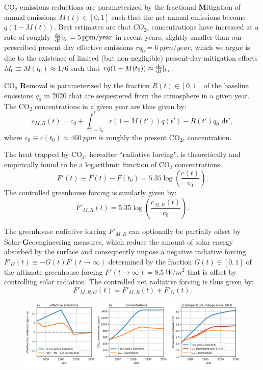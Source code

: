 \documentclass{article}
\begin{document}
CO$_{2}$ emissions reductions are parameterized by the fractional \textbf{M}itigation of annual emissions $M(t) \in [0,1]$ such that the net annual emissions become $q(1-M(t))$. Best estimates are that $CO_{2e}$ concentrations have increased at a rate of roughly $\dv{c}{t}|_{t_{0}} = \SI{5}{ppm/year}$ in recent years, slightly smaller than our prescribed present day effective emissions $rq_{0}= \SI{6}{ppm/year}$, which we argue is due to the existence of limited (but non-negligible) present-day mitigation efforts $M_{0} \equiv M(t_{0}) \approx 1/6$ such that $rq(1-M(t_{0})) \approx \dv{c}{t}|_{t_{0}}$.

CO$_{2}$ \textbf{R}emoval is parameterized by the fraction $R(t) \in [0,1]$ of the baseline emissions $q_{0}$ in 2020 that are sequestered from the atmosphere in a given year. The CO$_{2}$ concentrations in a given year are thus given by:
\begin{equation}
    c_{M, R}(t) = c_{0} + \int_{t'=t_{0}}^{t} r(1-M(t'))q(t') - R(t')q_{0} \text{ d}t'\label{eq-CO2-conc},
\end{equation}
where $c_{0} \equiv c(t_{0}) \approx \SI{460}{ppm}$ is roughly the present CO$_{2e}$ concentration.

The heat trapped by CO$_{2}$, hereafter ``radiative forcing", is theoretically and empirically found to be a logarithmic function of CO$_{2}$ concentrations
\begin{equation}
    F'(t) \equiv F(t) - F(t_{0}) = 5.35 \log(\frac{c(t)}{c_{0}}).
\end{equation}
The controlled greenhouse forcing is similarly given by:
\begin{equation}
    F'_{M, R}(t) = 5.35 \log(\frac{c_{M, R}(t)}{c_{0}}).
\end{equation}

The greenhouse radiative forcing $F'_{M, R}$ can optionally be partially offset by Solar-\textbf{G}eoengineering measures, which reduce the amount of solar energy absorbed by the surface and consequently impose a negative radiative forcing $F'_{G}(t) \equiv -G(t)F'(t \rightarrow \infty)$ determined by the fraction $G(t) \in [0,1]$ of the ultimate greenhouse forcing  $F'(t \rightarrow \infty) = \SI{8.5}{W/m^{2}}$ that is offset by controlling solar radiation. The controlled net radiative forcing is thus given by:
\begin{equation}
    F'_{M, R, G}(t) = F'_{M, R}(t) + F'_{G}(t).
\end{equation}

\begin{figure}[htb!]
\noindent\includegraphics[width=1.0\textwidth]{figures/default-temp_carbon_and_temperatures.png}
\centering
\caption{}
\label{fig.temp_and_carbon}
\end{figure}
\end{document}
